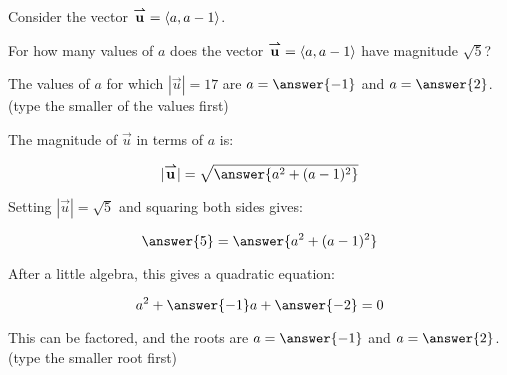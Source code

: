\documentclass{ximera}
\author{Jim Talamo}
\begin{document}
\begin{exercise}
Consider the vector ${\overset{\boldsymbol{\rightharpoonup}}{\mathbf{u}}} = \left\langle a,a-1\right\rangle$.

For how many values of $a$ does the vector ${\overset{\boldsymbol{\rightharpoonup}}{\mathbf{u}}} = \left\langle a,a-1\right\rangle$ have magnitude $\sqrt{5}$?

\begin{multipleChoice}
\end{multipleChoice}

The values of $a$ for which $|\vec{u}| = 17$ are $a= \answer{-1}$ and $a=\answer{2}$.
(type the smaller of the values first)

\begin{hint}
The magnitude of $\vec{u}$ in terms of $a$ is:

\[
|\vec{u}| = \sqrt{\answer{a^2+(a-1)^2} }
\]

Setting $|\vec{u}| = \sqrt{5}$ and squaring both sides gives:

\[
\answer{5} = \answer{a^2+(a-1)^2}
\]

After a little algebra, this gives a quadratic equation:

\[
a^2 +\answer{-1}a+\answer{-2} = 0
\]

This can be factored, and the roots are $a=\answer{-1}$ and $a=\answer{2}$.
(type the smaller root first)
\end{hint}


\end{exercise}
\end{document}
